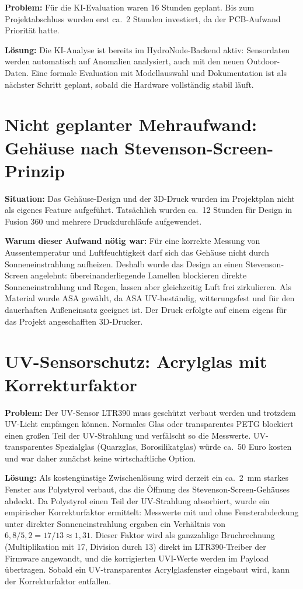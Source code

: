 \textbf{Problem:} Für die KI-Evaluation waren 16 Stunden geplant. Bis zum Projektabschluss wurden erst ca.\ 2 Stunden investiert, da der PCB-Aufwand Priorität hatte.

\textbf{Lösung:} Die KI-Analyse ist bereits im HydroNode-Backend aktiv: Sensordaten werden automatisch auf Anomalien analysiert, auch mit den neuen Outdoor-Daten. Eine formale Evaluation mit Modellauswahl und Dokumentation ist als nächster Schritt geplant, sobald die Hardware vollständig stabil läuft.

\section*{Nicht geplanter Mehraufwand: Gehäuse nach Stevenson-Screen-Prinzip}

\textbf{Situation:} Das Gehäuse-Design und der 3D-Druck wurden im Projektplan nicht als eigenes Feature aufgeführt. Tatsächlich wurden ca.\ 12 Stunden für Design in Fusion 360 und mehrere Druckdurchläufe aufgewendet.

\textbf{Warum dieser Aufwand nötig war:} Für eine korrekte Messung von Aussentemperatur und Luftfeuchtigkeit darf sich das Gehäuse nicht durch Sonneneinstrahlung aufheizen. Deshalb wurde das Design an einen Stevenson-Screen angelehnt: übereinanderliegende Lamellen blockieren direkte Sonneneinstrahlung und Regen, lassen aber gleichzeitig Luft frei zirkulieren. Als Material wurde ASA gewählt, da ASA UV-beständig, witterungsfest und für den dauerhaften Außeneinsatz geeignet ist. Der Druck erfolgte auf einem eigens für das Projekt angeschafften 3D-Drucker.

\section*{UV-Sensorschutz: Acrylglas mit Korrekturfaktor}

\textbf{Problem:} Der UV-Sensor LTR390 muss geschützt verbaut werden und trotzdem UV-Licht empfangen können. Normales Glas oder transparentes PETG blockiert einen großen Teil der UV-Strahlung und verfälscht so die Messwerte. UV-transparentes Spezialglas (Quarzglas, Borosilikatglas) würde ca.\ 50 Euro kosten und war daher zunächst keine wirtschaftliche Option.

\textbf{Lösung:} Als kostengünstige Zwischenlösung wird derzeit ein ca.\ 2~mm starkes Fenster aus Polystyrol verbaut, das die Öffnung des Stevenson-Screen-Gehäuses abdeckt. Da Polystyrol einen Teil der UV-Strahlung absorbiert, wurde ein empirischer Korrekturfaktor ermittelt: Messwerte mit und ohne Fensterabdeckung unter direkter Sonneneinstrahlung ergaben ein Verhältnis von $6{,}8 / 5{,}2 = 17/13 \approx 1{,}31$. Dieser Faktor wird als ganzzahlige Bruchrechnung (Multiplikation mit 17, Division durch 13) direkt im LTR390-Treiber der Firmware angewandt, und die korrigierten UVI-Werte werden im Payload übertragen. Sobald ein UV-transparentes Acrylglasfenster eingebaut wird, kann der Korrekturfaktor entfallen.

